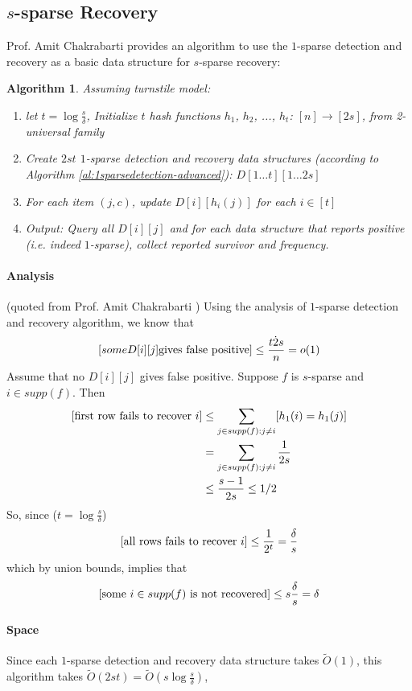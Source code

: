 \documentclass[11pt]{article}
\theoremstyle{plain}
\newtheorem{algorithm}{Algorithm}[section]
\let\Pr\relax
\DeclareMathOperator*{\Pr}{\mathbb{P}}
\begin{document}
\subsection{$s$-sparse Recovery}
Prof. Amit Chakrabarti  \cite{Cha2015-notes} provides an algorithm to use the 
$1$-sparse detection and recovery as a basic data structure for $s$-sparse 
recovery:

\begin{algorithm}
	\label{al:ssparse}
	Assuming turnstile model: 
	\begin{enumerate}
		\item let $t=\log \frac{s}{\delta}$, Initialize $t$ hash functions $h_1$, 
		$h_2$, ..., $h_t$: $[n]\rightarrow [2s]$, from 2-universal family
		\item Create $2st$ $1$-sparse detection and recovery data structures 
		(according to Algorithm \ref{al:1sparsedetection-advanced}): 
		$D[1\dots t][1\dots 2s]$
		\item For each item $(j,c)$, update $D[i][h_i(j)]$ for each $i\in [t]$ 
		\item Output: Query all $D[i][j]$ and for each data structure that reports 
		positive (i.e. indeed $1$-sparse), collect reported survivor and frequency. 
	\end{enumerate}
\end{algorithm}

\paragraph{Analysis} (quoted from Prof. Amit Chakrabarti  
\cite{Cha2015-notes} )
Using the analysis of $1$-sparse detection and recovery algorithm, we know 
that 
\[
\Pr[some D[i][j] \text{gives false positive}] \leq \frac{t\dot 2s}{n}=o(1)
\]
Assume that no $D[i][j]$ gives false positive. Suppose $f$ is $s$-sparse and 
$i\in supp(f)$. Then 
\begin{align*}
\Pr[\text{first row fails to recover } i]&\leq \sum_{j\in supp(f):j\neq 
	i}\Pr[h_1(i)=h_1(j)]\\&=\sum_{j\in supp(f):j\neq i} \frac{1}{2s}\\&\leq 
	\frac{s-1}{2s}\leq 1/2
\end{align*}
So, since ($t=\log \frac{s}{\delta}$)
\[
\Pr[\text{all rows fails to recover } i]\leq \frac{1}{2^{t}}=\frac{\delta}{s}
\]
which by union bounds, implies that 
\[
\Pr[\text{some } i\in supp(f) \text{ is not recovered}]\leq s\frac{\delta}{s}=\delta
\]

\paragraph{Space}
Since each $1$-sparse detection and recovery data structure takes 
$\tilde{O}(1)$, this algorithm takes 
$\tilde{O}(2st)=\tilde{O}(s\log\frac{s}{\delta})$,
\end{document}
